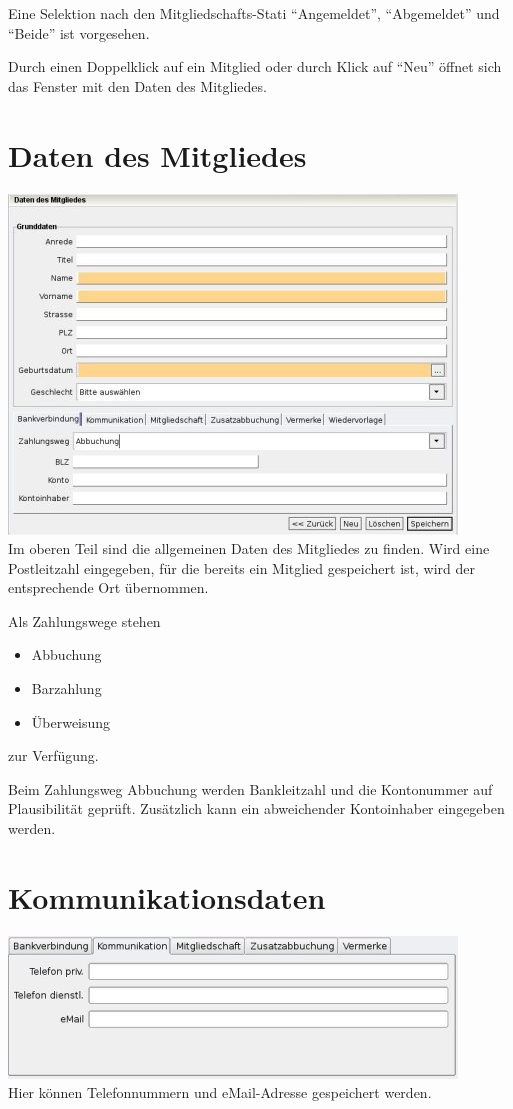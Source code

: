 \documentclass[a4paper,BCOR30mm,DIV14,pdftex,liststotoc,footsepline,openany]{scrbook}
\begin{document}
Eine Selektion nach den Mitgliedschafts-Stati ``Angemeldet'', ``Abgemeldet'' und ``Beide'' ist vorgesehen.

Durch einen Doppelklick auf ein Mitglied oder durch Klick auf ``Neu'' öffnet sich das Fenster mit den Daten des Mitgliedes.
\section{Daten des Mitgliedes}
\includegraphics{./screenshots/mitglied.jpg}\\
Im oberen Teil sind die allgemeinen Daten des Mitgliedes zu finden. Wird eine Postleitzahl eingegeben, für die 
bereits ein Mitglied gespeichert ist, wird der entsprechende Ort übernommen. 

Als Zahlungswege stehen
\begin{itemize}
 \item Abbuchung
 \item Barzahlung
 \item Überweisung
\end{itemize}
zur Verfügung.


Beim Zahlungsweg Abbuchung werden Bankleitzahl und die Kontonummer auf Plausibilität geprüft. Zusätzlich kann ein
abweichender Kontoinhaber eingegeben werden.

\section{Kommunikationsdaten}
\includegraphics{./screenshots/mitgliedkommunikation.jpg}\\
Hier können Telefonnummern und eMail-Adresse gespeichert werden.
\end{document}
